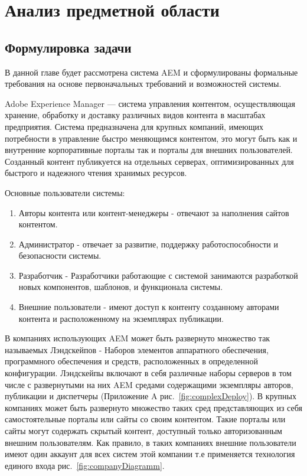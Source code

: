 \chapter{Анализ предметной области}
\label{cha:analysis}
%
%


\section{Формулировка задачи}
В данной главе будет рассмотрена система AEM и сформулированы формальные требования на основе первоначальных требований и возможностей системы.

Adobe Experience Manager — система управления контентом, осуществляющая хранение, обработку и доставку различных видов контента в масштабах предприятия. Система предназначена для крупных компаний, имеющих потребности в управление быстро меняющимся контентом, это могут быть как и внутренние корпоративные порталы так и порталы для внешних пользователей. Созданный контент публикуется на отдельных серверах, оптимизированных для быстрого и надежного чтения хранимых ресурсов.

Основные пользователи системы:
\begin{enumerate}
\item Авторы контента или контент-менеджеры - отвечают за наполнения сайтов контентом.
\item Администратор - отвечает за развитие, поддержку работоспособности и безопасности системы.
\item Разработчик - Разработчики работающие с системой занимаются разработкой новых компонентов, шаблонов, и функционала системы.
\item Внешние пользователи - имеют доступ к контенту созданному авторами контента и расположенному на экземплярах публикации.
\end{enumerate}

В компаниях использующих AEM может быть развернуто множество так называемых Лэндскейпов - Наборов элементов аппаратного обеспечения, программного обеспечения и средств, расположенных в определенной конфигурации. Лэндскейпы включают в себя различные наборы серверов в том числе с развернутыми на них AEM средами содержащими экземпляры авторов, публикации и диспетчеры (Приложение A рис.~\ref{fig:complexDeploy}). В крупных компаниях может быть развернуто множество таких сред представляющих из себя самостоятельные порталы или сайты со своим контентом. Такие порталы или сайты могут содержать скрытый контент, доступный только авторизованным внешним пользователям. Как правило, в таких компаниях внешние пользователи имеют один аккаунт для всех систем этой компании т.е применяется технология единого входа рис.~\ref{fig:companyDiagramm}.

